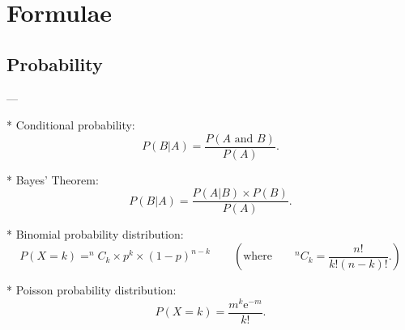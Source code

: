 



%




%
\newpage
\section*{Formulae}
\subsection*{Probability}
--- 

* Conditional probability:
\begin{equation*}
P(B|A)=\frac{P\left( A\text{ and }B\right) }{P\left( A\right) }.
\end{equation*}


* Bayes' Theorem:
\begin{equation*}
P(B|A)=\frac{P\left(A|B\right) \times P(B) }{P\left( A\right) }.
\end{equation*}


* Binomial probability distribution:
\begin{equation*}
P(X = k) = ^{n}C_{k} \times p^{k} \times \left( 1-p\right) ^{n-k}\qquad \left( \text{where}\qquad
^{n}C_{k} =\frac{n!}{k!\left(n-k\right) !}. \right)
\end{equation*}

* Poisson probability distribution:
\begin{equation*}
P(X = k) =\frac{m^{k}\mathrm{e}^{-m}}{k!}.
\end{equation*}


